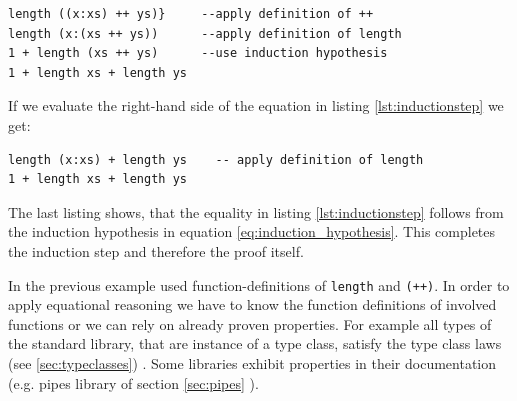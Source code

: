 \begin{description}
\begin{program}
\begin{verbatim}
length ((x:xs) ++ ys)}     --apply definition of ++
length (x:(xs ++ ys))      --apply definition of length
1 + length (xs ++ ys)      --use induction hypothesis
1 + length xs + length ys
\end{verbatim}
\end{program}

If we evaluate the right-hand side of the equation in listing \ref{lst:inductionstep} we get:
\begin{program}
\begin{verbatim}
length (x:xs) + length ys    -- apply definition of length
1 + length xs + length ys
\end{verbatim}
\end{program}

The last listing shows, that the equality in listing \ref{lst:inductionstep} follows from the induction hypothesis in equation \ref{eq:induction_hypothesis}. This completes the induction step and therefore the proof itself.
\end{description}

In the previous example used \glspl{function-definition} of \verb|length| and \verb|(++)|. In order to apply equational reasoning we have to know the function definitions of involved functions or we can rely on already proven properties. 
For example all types of the standard library, that are instance of a type class, satisfy the type class laws (see \ref{sec:typeclasses}) \cite{yorgey}. Some libraries exhibit properties in their documentation (e.g. pipes library of section \ref{sec:pipes} \cite{gonzales13}). 
